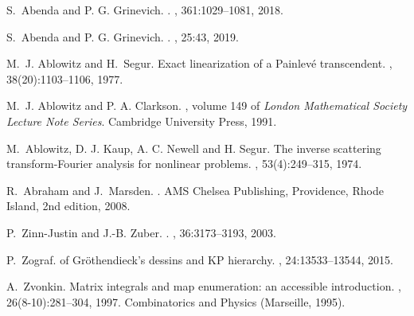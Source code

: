 \begin{thebibliography}{}

S.~{Abenda and P. G. Grinevich}.
.
, 361:1029--1081, 2018.

S.~{Abenda and P. G. Grinevich}.
.
, 25:43, 2019.

M.~J. Ablowitz and H.~Segur.
\newblock Exact linearization of a {Painlev\'e transcendent}.
, 38(20):1103--1106, 1977.

M.~J. {Ablowitz and P. A. Clarkson}.
,
  volume 149 of {\em London Mathematical Society Lecture Note Series}.
\newblock Cambridge University Press, 1991.

M.~{Ablowitz, D. J. Kaup, A. C. Newell and H. Segur}.
\newblock The inverse scattering transform-{F}ourier analysis for nonlinear
  problems.
, 53(4):249--315, 1974.

R.~Abraham and J.~Marsden.
.
\newblock AMS Chelsea Publishing, Providence, Rhode Island, 2nd edition, 2008.


P.~Zinn-Justin and J.-B. Zuber.
.
, 36:3173--3193, 2003.

P.~Zograf.
 of {Gr\"othendieck's dessins and KP hierarchy}.
, 24:13533--13544, 2015.

A.~Zvonkin.
\newblock Matrix integrals and map enumeration: an accessible introduction.
, 26(8-10):281--304, 1997.
\newblock Combinatorics and Physics (Marseille, 1995).

\end{thebibliography}

